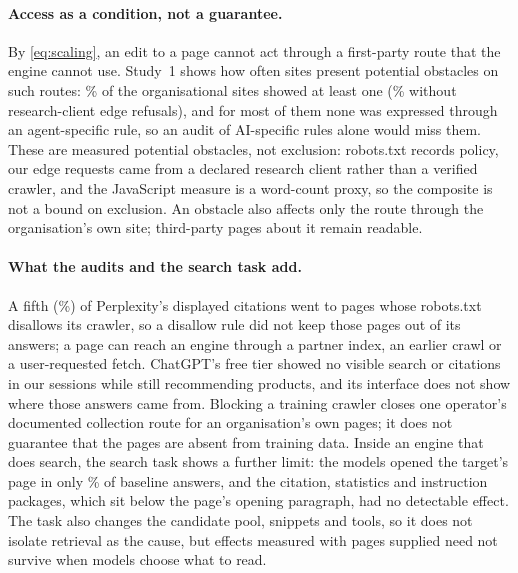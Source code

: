 \paragraph{Access as a condition, not a guarantee.} By \cref{eq:scaling}, an edit to a page cannot act through a
first-party route that the engine cannot use. Study~1 shows how often sites present potential obstacles on such routes:
\BarAny\% of the organisational sites showed at least one (\BarNoEdge\% without research-client edge refusals), and for
most of them none was expressed through an agent-specific rule, so an audit of AI-specific rules alone would miss them.
These are measured potential obstacles, not exclusion: robots.txt records policy, our edge requests came from a declared
research client rather than a verified crawler, and the JavaScript measure is a word-count proxy, so the composite is
not a bound on exclusion. An obstacle also affects only the route through the organisation's own site; third-party
pages about it remain readable.

\paragraph{What the audits and the search task add.} A fifth (\AudPBlockedPct\%) of Perplexity's displayed citations
went to pages whose robots.txt disallows its crawler, so a disallow rule did not keep those pages out of its answers; a
page can reach an engine through a partner index, an earlier crawl or a user-requested fetch. ChatGPT's free tier showed
no visible search or citations in our \AudCNQ{} sessions while still recommending products, and its interface does not
show where those answers came from. Blocking a training crawler closes one operator's documented collection route for
an organisation's own pages; it does not guarantee that the pages are absent from training data. Inside an engine that
does search, the search task shows a further limit: the models opened the target's page in only \AgBaseOpen\% of
baseline answers, and the citation, statistics and instruction packages, which sit below the page's opening paragraph,
had no detectable effect. The task also changes the candidate pool, snippets and tools, so it does not isolate
retrieval as the cause, but effects measured with pages supplied need not survive when models choose what to read.

